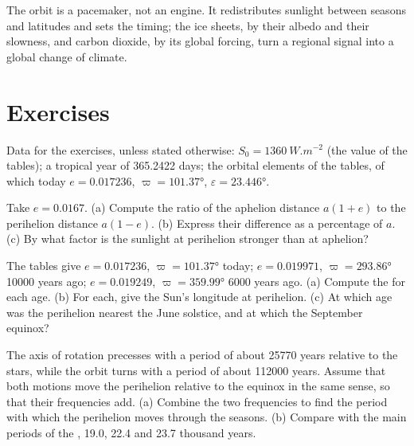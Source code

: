 The orbit is a pacemaker, not an engine. It redistributes sunlight between seasons and latitudes
and sets the timing; the ice sheets, by their albedo and their slowness, and carbon dioxide, by
its global forcing, turn a regional signal into a global change of climate.

\section*{Exercises}\label{sec:b2:orbital-forcing:exercises}

Data for the exercises, unless stated otherwise: $S_0 = \qty{1360}{W.m^{-2}}$ (the value of the
tables); a tropical year of \num{365.2422} days; the orbital elements of the tables, of which today
$e = 0.017236$, $\varpi = \ang{101.37}$, $\varepsilon = \ang{23.446}$.

\begin{exercise}[$\star$]\label{exo:b2:orbital-forcing:1}
Take $e = 0.0167$. (a) Compute the ratio of the aphelion distance $a(1 + e)$ to the perihelion
distance $a(1 - e)$. (b) Express their difference as a percentage of $a$. (c) By what factor is
the sunlight at perihelion stronger than at aphelion?
\end{exercise}

\begin{exercise}[$\star$]\label{exo:b2:orbital-forcing:2}
The tables give $e = 0.017236$, $\varpi = \ang{101.37}$ today; $e = 0.019971$, $\varpi =
\ang{293.86}$ \num{10000} years ago; $e = 0.019249$, $\varpi = \ang{359.99}$ \num{6000} years ago.
(a) Compute the  for each age. (b) For each, give the Sun's longitude at
perihelion. (c) At which age was the perihelion nearest the June solstice, and at which the
September equinox?
\end{exercise}

\begin{exercise}[$\star$]\label{exo:b2:orbital-forcing:3}
The axis of rotation precesses with a period of about \num{25770} years relative to the stars, while
the orbit turns with a period of about \num{112000} years. Assume that both motions move the
perihelion relative to the equinox in the same sense, so that their frequencies add. (a) Combine
the two frequencies to find the period with which the perihelion
moves through the seasons. (b) Compare with the main periods of the , \num{19.0},
\num{22.4} and \num{23.7} thousand years.
\end{exercise}

